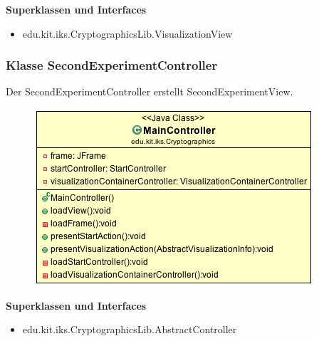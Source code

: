 \documentclass{article}
\begin{document}
      \textbf{Superklassen und Interfaces}
      \begin{itemize}
        \item edu.kit.iks.CryptographicsLib.VisualizationView
      \end{itemize}

    \subsubsection{Klasse SecondExperimentController}
      Der SecondExperimentController erstellt SecondExperimentView.
      \begin{figure}[H]
        \centering
        \includegraphics[width=\textwidth]{resources/edu-kit-iks-Cryptographics-MainController}
      \end{figure}

      \textbf{Superklassen und Interfaces}
      \begin{itemize}
        \item edu.kit.iks.CryptographicsLib.AbstractController
      \end{itemize}
\end{document}

